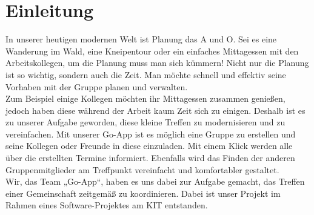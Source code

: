 \section{Einleitung}
In unserer heutigen modernen Welt ist Planung das A und O. Sei es eine Wanderung im Wald, eine Kneipentour oder ein einfaches Mittagessen mit den Arbeitskollegen, um die Planung muss man sich kümmern! 
Nicht nur die Planung ist so wichtig, sondern auch die Zeit. Man möchte schnell und effektiv seine Vorhaben mit der Gruppe planen und verwalten.\\
Zum Beispiel einige Kollegen möchten ihr Mittagessen zusammen genießen, jedoch haben diese während der Arbeit kaum Zeit sich zu einigen. Deshalb ist es zu unserer Aufgabe geworden, diese kleine Treffen zu modernisieren und zu vereinfachen. Mit unserer Go-App ist es möglich eine Gruppe zu erstellen und seine Kollegen oder Freunde in diese einzuladen. Mit einem Klick werden alle über die erstellten Termine informiert. Ebenfalls wird das Finden der anderen Gruppenmitglieder am Treffpunkt vereinfacht und komfortabler gestaltet.\\
Wir, das Team „Go-App“, haben es uns dabei zur Aufgabe gemacht, das Treffen einer Gemeinschaft zeitgemäß zu koordinieren. Dabei ist unser Projekt im Rahmen eines Software-Projektes am KIT entstanden. \\